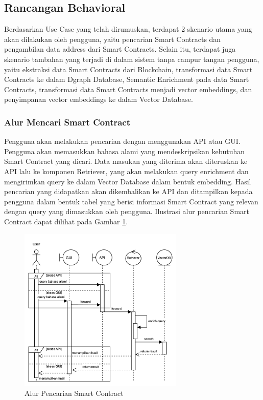 \subsection{Rancangan Behavioral}

Berdasarkan Use Case yang telah dirumuskan, terdapat 2 skenario utama yang akan dilakukan oleh pengguna, yaitu pencarian Smart Contracts dan pengambilan data address dari Smart Contracts. Selain itu, terdapat juga skenario tambahan yang terjadi di dalam sistem tanpa campur tangan pengguna, yaitu ekstraksi data Smart Contracts dari Blockchain, transformasi data Smart Contracts ke dalam Dgraph Database, Semantic Enrichment pada data Smart Contracts, transformasi data Smart Contracts menjadi vector embeddings, dan penyimpanan vector embeddings ke dalam Vector Database.

\subsubsection{Alur Mencari Smart Contract}

Pengguna akan melakukan pencarian dengan menggunakan API atau GUI. Pengguna akan memasukkan bahasa alami yang mendeskripsikan kebutuhan Smart Contract yang dicari. Data masukan yang diterima akan diteruskan ke API lalu ke komponen Retriever, yang akan melakukan query enrichment dan mengirimkan query ke dalam Vector Database dalam bentuk embedding. Hasil pencarian yang didapatkan akan dikembalikan ke API dan ditampilkan kepada pengguna dalam bentuk tabel yang berisi informasi Smart Contract yang relevan dengan query yang dimasukkan oleh pengguna. Ilustrasi alur pencarian Smart Contract dapat dilihat pada Gambar \ref{image:alur-pencarian-smart-contract}.

\begin{figure}[ht]
	\centering
	\includegraphics[width=0.7\textwidth]{resources/chapter-3/sequence-1.png}
	\caption{Alur Pencarian Smart Contract}
	\label{image:alur-pencarian-smart-contract}
\end{figure}

